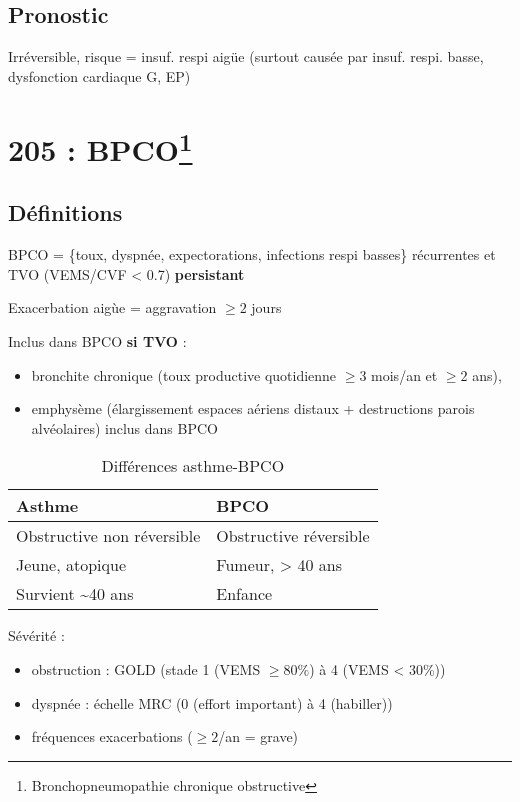\documentclass{article}
\begin{document}
\subsection{Pronostic}
\label{sec:org2ec66b4}
Irréversible, risque = insuf. respi aigüe (surtout causée par insuf. respi. basse, dysfonction
cardiaque G, EP)


\section{205 : BPCO\footnote{Bronchopneumopathie chronique obstructive}}
\label{sec:205-bpco}

\subsection{Définitions}
BPCO = \{toux, dyspnée, expectorations, infections respi basses\} récurrentes et
TVO (VEMS/CVF < 0.7)
\textbf{persistant}

Exacerbation aigùe = aggravation \(\ge 2\) jours

Inclus dans BPCO \textbf{si TVO} : 
\begin{itemize}
\item bronchite chronique (toux productive quotidienne \(\ge 3\) mois/an et \(\ge 2\) ans),
\item emphysème (élargissement espaces aériens distaux + destructions parois
alvéolaires) inclus dans BPCO
\end{itemize}

\begin{table}[htbp]
  \caption{Différences asthme-BPCO}
  \centering
  \begin{tabular}{ll}
    \toprule
    Asthme & BPCO\\
    \midrule
    Obstructive non réversible & Obstructive réversible\\
    Jeune, atopique & Fumeur, > 40 ans\\
    Survient \textasciitilde{}40 ans & Enfance\\
    \bottomrule
  \end{tabular}
\end{table}

Sévérité : 
\begin{itemize}
\item obstruction : GOLD (stade 1 (VEMS $\ge 80\%$) à 4 (VEMS < 30\%))
\item dyspnée : échelle MRC (0 (effort important) à 4 (habiller))
\item fréquences exacerbations ($\ge 2$/an = grave)
\end{itemize}
\end{document}
